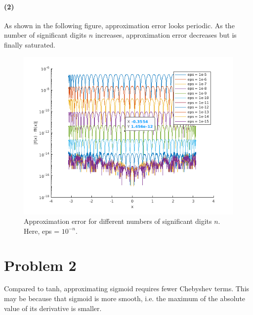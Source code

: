 \documentclass[11pt]{report}
\begin{document}
\paragraph{(2)}
As shown in the following figure, approximation error looks periodic. As the number of significant digits $n$ increases, approximation error decreases but is finally saturated.
\begin{figure}[H]
    \centering
    \includegraphics[width=0.8\linewidth]{CS598SMPPL/hw1/1.2.png}
    \caption{Approximation error for different numbers of significant digits $n$. Here, eps = $10^{-n}$.}
\end{figure}

\section*{Problem 2}
Compared to tanh, approximating sigmoid requires fewer Chebyshev terms. This may be because that sigmoid is more smooth, i.e. the maximum of the absolute value of its derivative is smaller.
\end{document}
